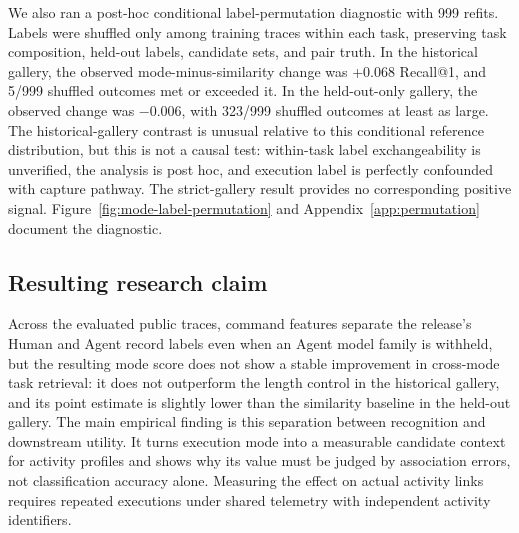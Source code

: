 We also ran a post-hoc conditional label-permutation diagnostic with 999 refits. Labels were shuffled only among training traces within each task, preserving task composition, held-out labels, candidate sets, and pair truth. In the historical gallery, the observed mode-minus-similarity change was +0.068 Recall@1, and 5/999 shuffled outcomes met or exceeded it. In the held-out-only gallery, the observed change was −0.006, with 323/999 shuffled outcomes at least as large. The historical-gallery contrast is unusual relative to this conditional reference distribution, but this is not a causal test: within-task label exchangeability is unverified, the analysis is post hoc, and execution label is perfectly confounded with capture pathway. The strict-gallery result provides no corresponding positive signal. Figure~\ref{fig:mode-label-permutation} and Appendix~\ref{app:permutation} document the diagnostic.

\subsection{Resulting research claim}
\label{sec:resulting-claim}

Across the evaluated public traces, command features separate the release's Human and Agent record labels even when an Agent model family is withheld, but the resulting mode score does not show a stable improvement in cross-mode task retrieval: it does not outperform the length control in the historical gallery, and its point estimate is slightly lower than the similarity baseline in the held-out gallery. The main empirical finding is this separation between recognition and downstream utility. It turns execution mode into a measurable candidate context for activity profiles and shows why its value must be judged by association errors, not classification accuracy alone. Measuring the effect on actual activity links requires repeated executions under shared telemetry with independent activity identifiers.
